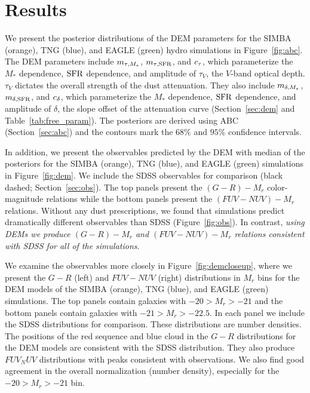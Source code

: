 \section{Results} \label{sec:results}
We present the posterior distributions of the DEM parameters for the SIMBA
(orange), TNG (blue), and EAGLE (green) hydro simulations in
Figure~\ref{fig:abc}. The DEM parameters include $m_{\tau,M_*}$, $m_{\tau,{\rm SFR}}$, and
$c_\tau$, which parameterize the $M_*$ dependence, ${\rm SFR}$ dependence, and 
amplitude of $\tau_V$, the $V$-band optical depth. $\tau_V$ dictates the
overall strength of the dust attenuation. They also include $m_{\delta,M_*}$,
$m_{\delta,{\rm SFR}}$, and $c_\delta$, which parameterize the $M_*$ dependence, ${\rm SFR}$ dependence,
and amplitude of $\delta$, the slope offset of the attenuation curve
(Section~\ref{sec:dem} and Table~\ref{tab:free_param}). The posteriors 
are derived using ABC (Section~\ref{sec:abc}) and the contours mark the 
$68\%$ and $95\%$ confidence intervals. 

In addition, we present the observables predicted by the DEM with median of the
posteriors for the SIMBA (orange), TNG (blue), and EAGLE (green) simulations 
in Figure~\ref{fig:dem}. We include the SDSS observables for comparison
(black dashed; Section~\ref{sec:obs}). The top panels present the $(G-R) - M_r$ 
color-magnitude relations while the bottom panels present the $(FUV-NUV) - M_r$
relations. Without any dust prescriptions, we found that simulations predict
dramatically different observables than SDSS (Figure~\ref{fig:obs}). 
In contrast, {\em using DEMs we produce $(G-R) - M_r$ and $(FUV-NUV) - M_r$
relations consistent with SDSS for all of the simulations}. 

We examine the observables more closely in Figure~\ref{fig:demcloseup}, where
we present the $G-R$ (left) and $FUV-NUV$ (right) distributions in $M_r$ 
bins for the DEM models of the SIMBA (orange), TNG (blue), and EAGLE (green) 
simulations. The top panels contain galaxies with $-20 > M_r > -21$ and the 
bottom panels contain galaxies with $-21 > M_r > -22.5$. In each panel we 
include the SDSS distributions for comparison. These distributions are 
number densities. The positions of the red sequence and blue cloud in the $G-R$
distributions for the DEM models are consistent with the SDSS distribution. 
They also produce $FUV_NUV$ distributions with peaks consistent with
observations. We also find good agreement in the overall normalization
(number density), especially for the $-20 > M_r > -21$ bin. 

